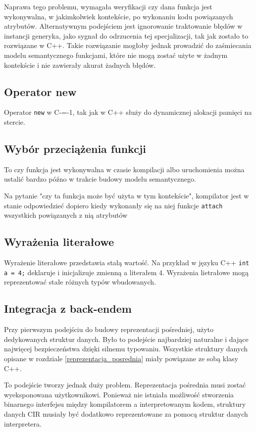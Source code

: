 Naprawa tego problemu, wymagała weryfikacji czy dana funkcja jest wykonywalna, w jakimkolwiek kontekście, po wykonaniu kodu powiązanych atrybutów.
Alternatywnym podejściem jest ignorowanie traktowanie błędów w instancji generyka, jako sygnał do odrzucenia tej specjalizacji, tak jak zostało to rozwiązane w C++. %
Takie rozwiązanie mogłoby jednak prowadzić do zaśmiecania modelu semantycznego funkcjami, które nie mogą zostać użyte w żadnym kontekście i nie zawierały akurat żadnych błędów.
\subsection{Operator new}
\label{operator_new}
Operator \lstinline{new} w C-=-1, tak jak w C++ służy do dynamicznej alokacji pamięci na stercie.

\subsection{Wybór przeciążenia funkcji}
\label{Function_overload_resolution}
To czy funkcja jest wykonywalna w czasie kompilacji albo uruchomienia można ustalić bardzo późno w trakcie budowy modelu semantycznego.

Na pytanie "czy ta funkcja może być użyta w tym kontekście", kompilator jest w stanie odpowiedzieć dopiero kiedy wykonanły się na niej funkcje \lstinline{attach} wszystkich powiązanych z nią atrybutów 
\subsection{Wyrażenia literałowe}

Wyrażenie literałowe przedstawia stałą wartość.
Na przykład w języku C++ \lstinline{int a = 4;} deklaruje i inicjalizuje zmienną a literałem 4.
Wyrażenia lietrałowe mogą reprezentować stałe różnych typów wbudowanych.

\subsection{Integracja z back-endem}
Przy pierwszym podejściu do budowy reprezentacji pośredniej, użyto dedykowanych struktur danych. Było to podejście najbardziej naturalne i dające najwięcej bezpieczeństwa dzięki silnemu typowaniu. Wszystkie struktury danych opisane w rozdziale \ref{reprezentacja_posrednia} miały powiązane ze sobą klasy C++.


To podejście tworzy jednak duży problem. Reprezentacja pośrednia musi zostać wyeksponowana użytkownikowi. Ponieważ nie istniała możliwość stworzenia binarnego interfejsu między kompilatorem a interpretowanym kodem, struktury danych CIR musiały być dodatkowo reprezentowane za pomocą struktur danych interpretera.


